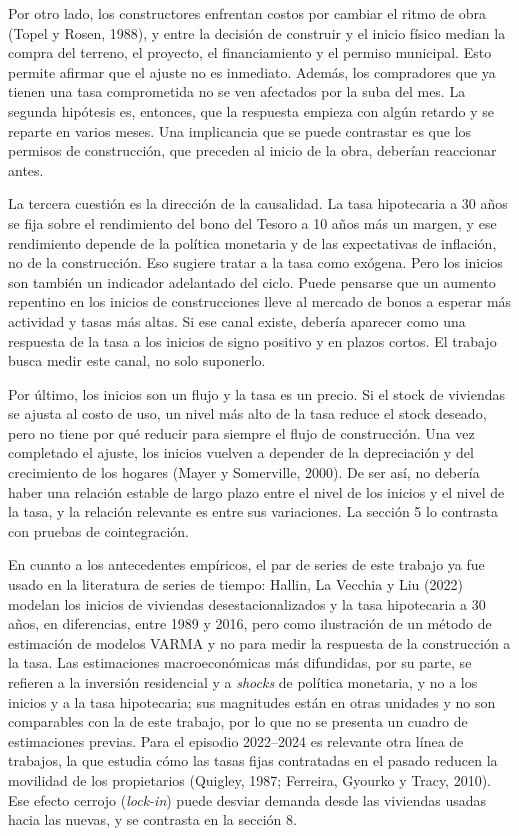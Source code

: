 \documentclass[11pt,a4paper]{article}
\begin{document}
Por otro lado, los constructores enfrentan costos por cambiar el ritmo de obra (Topel y Rosen, 1988), y entre la decisión de construir y el inicio físico median la compra del terreno, el proyecto, el financiamiento y el permiso municipal. Esto permite afirmar que el ajuste no es inmediato. Además, los compradores que ya tienen una tasa comprometida no se ven afectados por la suba del mes. La segunda hipótesis es, entonces, que la respuesta empieza con algún retardo y se reparte en varios meses. Una implicancia que se puede contrastar es que los permisos de construcción, que preceden al inicio de la obra, deberían reaccionar antes.

La tercera cuestión es la dirección de la causalidad. La tasa hipotecaria a 30 años se fija sobre el rendimiento del bono del Tesoro a 10 años más un margen, y ese rendimiento depende de la política monetaria y de las expectativas de inflación, no de la construcción. Eso sugiere tratar a la tasa como exógena. Pero los inicios son también un indicador adelantado del ciclo. Puede pensarse que un aumento repentino en los inicios de construcciones lleve al mercado de bonos a esperar más actividad y tasas más altas. Si ese canal existe, debería aparecer como una respuesta de la tasa a los inicios de signo positivo y en plazos cortos. El trabajo busca medir este canal, no solo suponerlo.

Por último, los inicios son un flujo y la tasa es un precio. Si el stock de viviendas se ajusta al costo de uso, un nivel más alto de la tasa reduce el stock deseado, pero no tiene por qué reducir para siempre el flujo de construcción. Una vez completado el ajuste, los inicios vuelven a depender de la depreciación y del crecimiento de los hogares (Mayer y Somerville, 2000). De ser así, no debería haber una relación estable de largo plazo entre el nivel de los inicios y el nivel de la tasa, y la relación relevante es entre sus variaciones. La sección 5 lo contrasta con pruebas de cointegración.

En cuanto a los antecedentes empíricos, el par de series de este trabajo ya fue usado en la literatura de series de tiempo: Hallin, La Vecchia y Liu (2022) modelan los inicios de viviendas desestacionalizados y la tasa hipotecaria a 30 años, en diferencias, entre 1989 y 2016, pero como ilustración de un método de estimación de modelos VARMA y no para medir la respuesta de la construcción a la tasa. Las estimaciones macroeconómicas más difundidas, por su parte, se refieren a la inversión residencial y a \emph{shocks} de política monetaria, y no a los inicios y a la tasa hipotecaria; sus magnitudes están en otras unidades y no son comparables con la de este trabajo, por lo que no se presenta un cuadro de estimaciones previas. Para el episodio 2022--2024 es relevante otra línea de trabajos, la que estudia cómo las tasas fijas contratadas en el pasado reducen la movilidad de los propietarios (Quigley, 1987; Ferreira, Gyourko y Tracy, 2010). Ese efecto cerrojo (\emph{lock-in}) puede desviar demanda desde las viviendas usadas hacia las nuevas, y se contrasta en la sección 8.
\end{document}
